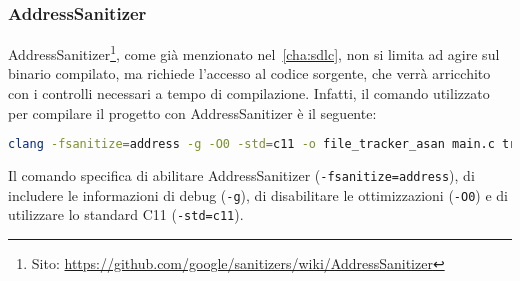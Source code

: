 \subsubsection*{AddressSanitizer}
AddressSanitizer\footnote{Sito: \url{https://github.com/google/sanitizers/wiki/AddressSanitizer}},
come già menzionato nel~\autoref{cha:sdlc}, non si limita ad agire sul binario compilato,
ma richiede l'accesso al codice sorgente, che verrà arricchito con i controlli necessari
a tempo di compilazione. Infatti, il comando utilizzato per compilare il progetto
con AddressSanitizer è il seguente:
\begin{lstlisting}[language=bash, numbers=none]
clang -fsanitize=address -g -O0 -std=c11 -o file_tracker_asan main.c tracker_core.c utils.c
\end{lstlisting}

Il comando specifica di abilitare AddressSanitizer (\texttt{-fsanitize=address}),
di includere le informazioni di debug (\texttt{-g}), di disabilitare le ottimizzazioni
(\texttt{-O0}) e di utilizzare lo standard C11 (\texttt{-std=c11}).

